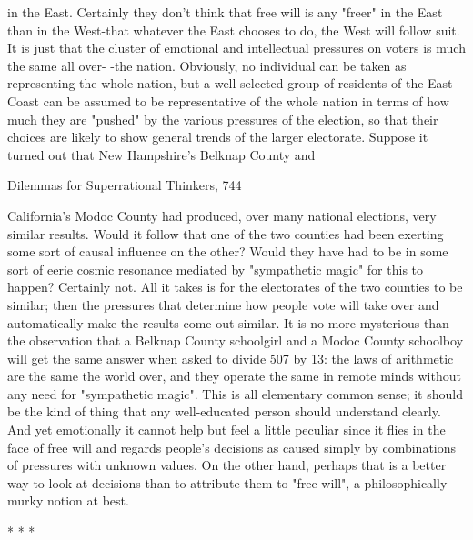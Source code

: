 in the East. Certainly they don't think that free will is any "freer" in the East than in
the West-that whatever the East chooses to do, the West will follow suit. It is just that
the cluster of emotional and intellectual pressures on voters is much the same all over-
-the nation. Obviously, no individual can be taken as representing the whole nation,
but a well-selected group of residents of the East Coast can be assumed to be
representative of the whole nation in terms of how much they are "pushed" by the
various pressures of the election, so that their choices are likely to show general
trends of the larger electorate.
        Suppose it turned out that New Hampshire's Belknap County and




Dilemmas for Superrational Thinkers,                                                 744

California's Modoc County had produced, over many national elections, very similar
results. Would it follow that one of the two counties had been exerting some sort of
causal influence on the other? Would they have had to be in some sort of eerie cosmic
resonance mediated by "sympathetic magic" for this to happen? Certainly not. All it
takes is for the electorates of the two counties to be similar; then the pressures that
determine how people vote will take over and automatically make the results come
out similar. It is no more mysterious than the observation that a Belknap County
schoolgirl and a Modoc County schoolboy will get the same answer when asked to
divide 507 by 13: the laws of arithmetic are the same the world over, and they operate
the same in remote minds without any need for "sympathetic magic".
        This is all elementary common sense; it should be the kind of thing that any
well-educated person should understand clearly. And yet emotionally it cannot help
but feel a little peculiar since it flies in the face of free will and regards people's
decisions as caused simply by combinations of pressures with unknown values. On
the other hand, perhaps that is a better way to look at decisions than to attribute them
to "free will", a philosophically murky notion at best.

                                        *   *   *


